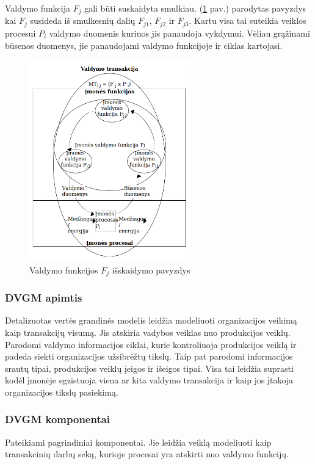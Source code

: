 Valdymo funkcija $F_j$ gali būti suskaidyta smulkiau.
(\ref{img:splitted_management_function} pav.) parodytas pavyzdys kai $F_j$
susideda iš smulkesnių dalių $F_{j1}$, $F_{j2}$ ir $F_{j3}$. Kartu visa tai
suteikia veiklos procesui $P_i$ valdymo duomenis kuriuos jis panaudoja vykdymui.
Vėliau grąžinami būsenos duomenys, jie panaudojami valdymo funkcijoje ir ciklas
kartojasi.

\begin{figure}[H]
	\centering
	\includegraphics[width=7cm]{img/splitted_management_function}
	\caption{Valdymo funkcijos $F_j$ išskaidymo pavyzdys}
	\label{img:splitted_management_function}
\end{figure}


\subsubsection{DVGM apimtis}

Detalizuotas vertės grandinės modelis leidžia modeliuoti organizacijos veikimą kaip
transakcijų visumą. Jis atskiria vadybos veiklas nuo produkcijos veiklų.
Parodomi valdymo informacijos ciklai, kurie kontroliuoja produkcijos veiklą ir
padeda siekti organizacijos užsibrėžtų tikslų. Taip pat parodomi informacijos srautų
tipai, produkcijos veiklų įeigos ir išeigos tipai. Visa tai leidžia suprasti
kodėl įmonėje egzistuoja viena ar kita valdymo transakcija ir kaip jos įtakoja
organizacijos tikslų pasiekimą.

\subsubsection{DVGM komponentai}

Pateikiami pagrindiniai \DVCM{} komponentai. Jie leidžia veiklą modeliuoti kaip transakcinių darbų seką, kurioje procesai yra atskirti nuo valdymo funkcijų.

